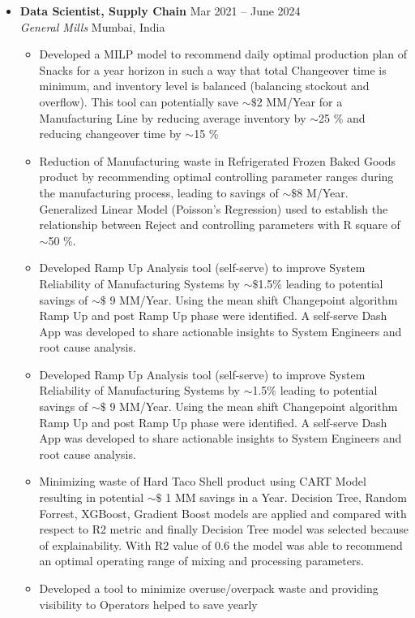 \documentclass[a4paper,10pt]{article}
\newcommand{\resumeItem}[1]{\item\small{#1}}
\newcommand{\resumeSubheading}[4]{
  \vspace{1pt}\item
    \textbf{#1} \hfill {#2} \\
    \emph{#3} \hfill {#4} \\
}
\begin{document}
\begin{itemize}
    \resumeSubheading
      {Data Scientist, Supply Chain}{Mar 2021 -- June 2024}
      {General Mills}{Mumbai, India}
      \begin{itemize}
          \resumeItem{
            Developed a MILP model to recommend daily optimal production plan of Snacks for a year horizon in such a
            way that total Changeover time is minimum, and inventory level is balanced (balancing stockout and overflow).
            This tool can potentially save $\sim\$$2 MM/Year for a Manufacturing Line by reducing average inventory by $\sim$25 \%
            and reducing changeover time by $\sim$15 \%
          }
          \resumeItem{
            Reduction of Manufacturing waste in Refrigerated Frozen Baked Goods product by recommending optimal
            controlling parameter ranges during the manufacturing process, leading to savings of $\sim\$$8 M/Year. Generalized
            Linear Model (Poisson’s Regression) used to establish the relationship between Reject and controlling
            parameters with R square of $\sim$50 \%.
          }
          \resumeItem{
            Developed Ramp Up Analysis tool (self-serve) to improve System Reliability of Manufacturing Systems by
            $\sim\$$1.5\% leading to potential savings of $\sim\$$ 9 MM/Year. Using the mean shift Changepoint algorithm Ramp Up
            and post Ramp Up phase were identified. A self-serve Dash App was developed to share actionable insights
            to System Engineers and root cause analysis.
          }
          \resumeItem{
            Developed Ramp Up Analysis tool (self-serve) to improve System Reliability of Manufacturing Systems by
            $\sim$1.5\% leading to potential savings of $\sim\$$ 9 MM/Year. Using the mean shift Changepoint algorithm Ramp Up
            and post Ramp Up phase were identified. A self-serve Dash App was developed to share actionable insights
            to System Engineers and root cause analysis.
          }
          \resumeItem{
            Minimizing waste of Hard Taco Shell product using CART Model resulting in potential $\sim\$$ 1 MM savings in a
            Year. Decision Tree, Random Forrest, XGBoost, Gradient Boost models are applied and compared with respect
            to R2 metric and finally Decision Tree model was selected because of explainability. With R2 value of 0.6 the
            model was able to recommend an optimal operating range of mixing and processing parameters.
          }
          \resumeItem{
            Developed a tool to minimize overuse/overpack waste and providing visibility to Operators helped to save yearly 
}
\end{itemize}
\end{itemize}
\end{document}
